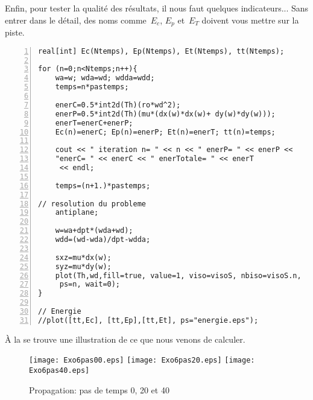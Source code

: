 \medskip
Enfin, pour tester la qualité des résultats, il nous faut quelques indicateurs...
Sans entrer dans le détail, des noms comme~$E_c$, $E_p$ et~$E_T$ doivent vous mettre sur
la piste.

\color{gris}\scriptsize
\begin{Verbatim}[numbers=left,numbersep=3pt,firstnumber=last]
real[int] Ec(Ntemps), Ep(Ntemps), Et(Ntemps), tt(Ntemps); 

for (n=0;n<Ntemps;n++){	
	wa=w; wda=wd; wdda=wdd; 	
	temps=n*pastemps; 

	enerC=0.5*int2d(Th)(ro*wd^2);
	enerP=0.5*int2d(Th)(mu*(dx(w)*dx(w)+ dy(w)*dy(w)));
	enerT=enerC+enerP;
	Ec(n)=enerC; Ep(n)=enerP; Et(n)=enerT; tt(n)=temps; 
		
	cout << " iteration n= " << n << " enerP= " << enerP << 
    "enerC= " << enerC << " enerTotale= " << enerT 
     << endl;
	
	temps=(n+1.)*pastemps; 

// resolution du probleme 
	antiplane;
	
	w=wa+dpt*(wda+wd);
	wdd=(wd-wda)/dpt-wdda; 

	sxz=mu*dx(w);
	syz=mu*dy(w); 
	plot(Th,wd,fill=true, value=1, viso=visoS, nbiso=visoS.n, 
     ps=n, wait=0); 	
}

// Energie 
//plot([tt,Ec], [tt,Ep],[tt,Et], ps="energie.eps"); 
\end{Verbatim}
\color{black}\normalsize

\medskip
À la  se trouve une illustration de ce que nous venons de calculer.

\begin{figure}[ht]
  \center
  \texttt{[image: Exo6pas00.eps]} \hfill
  \texttt{[image: Exo6pas20.eps]} \hfill
  \texttt{[image: Exo6pas40.eps]}
  \caption{\label{Fig-Exo6} Propagation: pas de temps 0, 20 et 40}
\end{figure}

